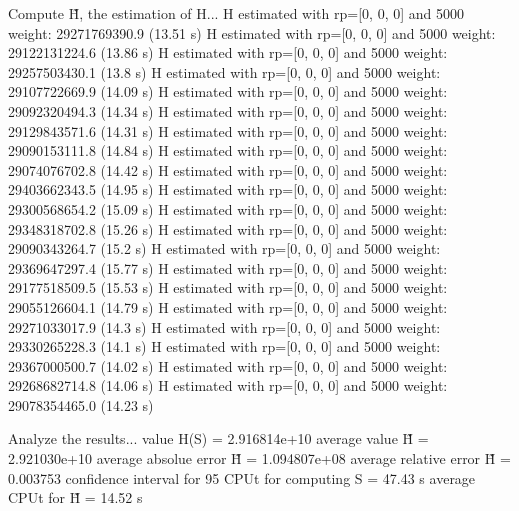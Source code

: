 Compute H̃, the estimation of H...
  H estimated with rp=[0, 0, 0] and 5000 weight:  29271769390.9  (13.51 s)
  H estimated with rp=[0, 0, 0] and 5000 weight:  29122131224.6  (13.86 s)
  H estimated with rp=[0, 0, 0] and 5000 weight:  29257503430.1  (13.8 s)
  H estimated with rp=[0, 0, 0] and 5000 weight:  29107722669.9  (14.09 s)
  H estimated with rp=[0, 0, 0] and 5000 weight:  29092320494.3  (14.34 s)
  H estimated with rp=[0, 0, 0] and 5000 weight:  29129843571.6  (14.31 s)
  H estimated with rp=[0, 0, 0] and 5000 weight:  29090153111.8  (14.84 s)
  H estimated with rp=[0, 0, 0] and 5000 weight:  29074076702.8  (14.42 s)
  H estimated with rp=[0, 0, 0] and 5000 weight:  29403662343.5  (14.95 s)
  H estimated with rp=[0, 0, 0] and 5000 weight:  29300568654.2  (15.09 s)
  H estimated with rp=[0, 0, 0] and 5000 weight:  29348318702.8  (15.26 s)
  H estimated with rp=[0, 0, 0] and 5000 weight:  29090343264.7  (15.2 s)
  H estimated with rp=[0, 0, 0] and 5000 weight:  29369647297.4  (15.77 s)
  H estimated with rp=[0, 0, 0] and 5000 weight:  29177518509.5  (15.53 s)
  H estimated with rp=[0, 0, 0] and 5000 weight:  29055126604.1  (14.79 s)
  H estimated with rp=[0, 0, 0] and 5000 weight:  29271033017.9  (14.3 s)
  H estimated with rp=[0, 0, 0] and 5000 weight:  29330265228.3  (14.1 s)
  H estimated with rp=[0, 0, 0] and 5000 weight:  29367000500.7  (14.02 s)
  H estimated with rp=[0, 0, 0] and 5000 weight:  29268682714.8  (14.06 s)
  H estimated with rp=[0, 0, 0] and 5000 weight:  29078354465.0  (14.23 s)

Analyze the results...
  value H(S)                  = 2.916814e+10 
  average value H̃             = 2.921030e+10 
  average absolue error H̃     = 1.094807e+08 
  average relative error H̃    = 0.003753 
  confidence interval for 95%
  CPUt for computing S         = 47.43 s
  average CPUt for H̃           = 14.52 s

